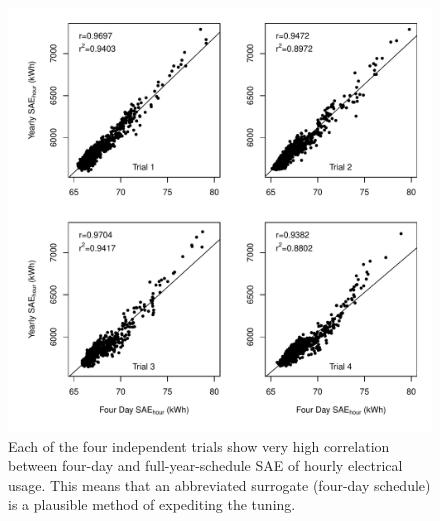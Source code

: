 \documentclass[preprint, review, 12pt]{elsarticle}
\begin{document}
\begin{figure}[tbp]
\centering
\includegraphics[width=5in]{figure1}
\caption{Each of the four independent trials show very high correlation between four-day and full-year-schedule SAE of hourly electrical usage. This means that an abbreviated surrogate (four-day schedule) is a plausible method of expediting the tuning.}
\label{fig:hour-corr}
\end{figure}
\end{document}
